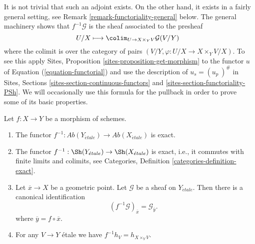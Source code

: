 \noindent
It is not trivial that such an adjoint exists.
On the other hand, it exists in a fairly general setting, see
Remark \ref{remark-functoriality-general}
below. The general machinery shows that $f^{-1}\mathcal{G}$
is the sheaf associated to the presheaf
\begin{equation}
\label{equation-pullback}
U/X
\longmapsto
\colim_{U \to X \times_Y V} \mathcal{G}(V/Y)
\end{equation}
where the colimit is over the category of pairs
$(V/Y, \varphi : U/X \to X \times_Y V/X)$.
To see this apply
Sites, Proposition \ref{sites-proposition-get-morphism}
to the functor $u$ of Equation (\ref{equation-functorial})
and use the description of $u_s = (u_p\ )^\#$ in
Sites, Sections \ref{sites-section-continuous-functors} and
\ref{sites-section-functoriality-PSh}.
We will occasionally use this formula for the pullback
in order to prove some of its basic properties.

\begin{lemma}
\label{lemma-stalk-pullback}
Let $f : X \to Y$ be a morphism of schemes.
\begin{enumerate}
\item The functor
$f^{-1} : \textit{Ab}(Y_{\acute{e}tale}) \to \textit{Ab}(X_{\acute{e}tale})$
is exact.
\item The functor
$f^{-1} : \Sh(Y_{\acute{e}tale}) \to \Sh(X_{\acute{e}tale})$
is exact, i.e., it commutes with finite limits and colimits, see
Categories, Definition \ref{categories-definition-exact}.
\item Let $\overline{x} \to X$ be a geometric point.
Let $\mathcal{G}$ be a sheaf on $Y_{\acute{e}tale}$.
Then there is a canonical identification
$$
(f^{-1}\mathcal{G})_{\overline{x}} = \mathcal{G}_{\overline{y}}.
$$
where $\overline{y} = f \circ \overline{x}$.
\item For any $V \to Y$ \'etale we have $f^{-1}h_V = h_{X \times_Y V}$.
\end{enumerate}
\end{lemma}

